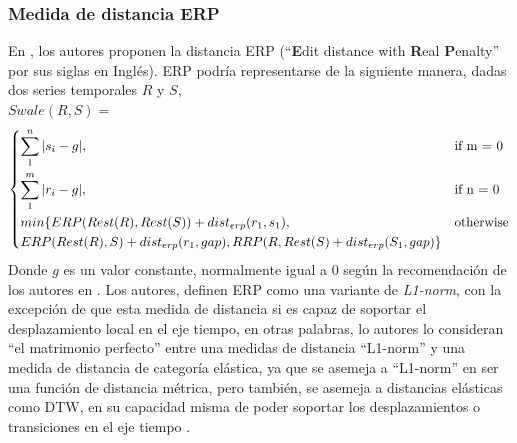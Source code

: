 \subsubsection{\textbf{Medida de distancia ERP}}
En \cite{erp}, los autores proponen la distancia ERP (\enquote{\textbf{E}dit distance with \textbf{R}eal \textbf{P}enalty} por sus siglas en Ingl\'es). ERP podr\'ia representarse de la siguiente manera, dadas dos series temporales $R$ y $S$,\\
$Swale(R, S) =$
\[
\begin{dcases}
    \sum\limits_{1}^{n}|s_i - g|,&   \text{if m = 0}\\
    \sum\limits_{1}^{m}|r_i - g|,&   \text{if n = 0}\\       
    {min\{ERP(Rest(R), Rest(S)) + dist_{erp}(r_1,s_1)}, & \text{otherwise}\\
    {ERP(Rest(R),S) + dist_{erp}(r_1,gap), RRP(R,Rest(S) + dist_{erp}(S_1,gap)}\} 
\end{dcases}
\]
Donde $g$ es un valor constante, normalmente igual a 0 seg\'un la recomendaci\'on de los autores en \cite{erp}. Los autores, definen ERP como una variante de \textit{L1-norm}, con la excepci\'on de que esta medida de distancia si es capaz de soportar el desplazamiento local en el eje tiempo, en otras palabras, lo autores lo consideran \enquote{el matrimonio perfecto} entre una medidas de distancia \enquote{L1-norm} y una medida de distancia de categor\'ia el\'astica, ya que se asemeja a \enquote{L1-norm} en ser una funci\'on de distancia m\'etrica, pero tambi\'en, se asemeja a distancias el\'asticas como DTW, en su capacidad misma de poder soportar los desplazamientos o transiciones en el eje tiempo \cite{erp}.
